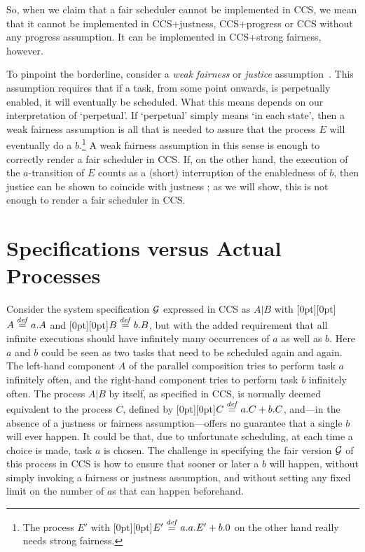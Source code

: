 \documentclass[smallcondensed]{svjour3}
\newcommand{\plat}[1]{\raisebox{0pt}[0pt][0pt]{#1}}  \def\precond#1{{\vphantom{#1}}^\bullet #1}
\begin{document}
So, when we claim that a fair scheduler cannot be implemented in CCS, we mean that it
cannot be implemented in CCS+justness, CCS+progress or CCS without any progress assumption.
It can be implemented in CCS+strong fairness, however. 

To pinpoint the borderline, 
consider a \emph{weak fairness} or \emph{justice} assumption~\cite{GPSS80,LPS81}. This assumption
requires that if a task, from some point onwards, is
perpetually enabled, it will eventually be scheduled. What this means depends on our interpretation
of `perpetual'. If `perpetual' simply means `in each state', then a weak fairness assumption
is all that is needed to assure that the process $E$ will eventually do a $b$.\footnote{The process
  $E'$ with {\plat{$E' \stackrel{{\it def}}{=} a.a.E' + b.0$}} on the other hand really needs
  strong fairness.} A weak fairness assumption in this
sense is enough to correctly render a fair scheduler in CCS\@. If, on the other hand, the execution
of the $a$-transition of $E$ counts as a (short) interruption of the enabledness of $b$, then
justice can be shown to coincide with justness \cite{GH14}; as we will show,
this is not enough to render a fair scheduler in CCS\@.

\section{Specifications versus Actual Processes}\label{ssec:spec vs implementation}


Consider the system specification $\cal G$ expressed in\vspace{2pt}
CCS as $A|B$ with \plat{$A \stackrel{{\it def}}{=} a.A$} and \plat{$B \stackrel{{\it def}}{=} b.B$},
but with the added requirement that all infinite executions should have infinitely many occurrences
of $a$ as well as $b$. Here $a$ and $b$ could be seen as two tasks that need to be scheduled again
and again. The left-hand component $A$ of the parallel composition tries to perform task $a$
infinitely often, and the right-hand component tries to perform task $b$ infinitely often.
The process $A|B$ by itself, as specified in CCS,\vspace{2pt} is normally deemed equivalent to the process $C$,
defined by \plat{$C \stackrel{{\it def}}{=} a.C + b.C$}, and---in the absence of a justness or
fairness assumption---offers no guarantee that a single $b$
will ever happen. It could be that, due to unfortunate scheduling, at each time a choice is made, task $a$
is chosen. The challenge in specifying the fair version $\cal G$ of this process in CCS is 
how to ensure that sooner or later a $b$ will happen, without simply invoking a fairness or justness
assumption, and without setting any fixed limit on the number of $a$s that can happen beforehand.
\end{document}
